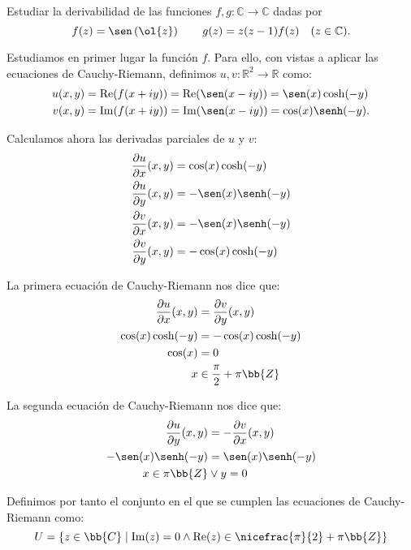 \documentclass[12pt]{article}
\renewcommand{\Re}{\operatorname{Re}} %
\renewcommand{\Im}{\operatorname{Im}}
\begin{document}
    \begin{ejercicio}[3 puntos]
        Estudiar la derivabilidad de las funciones $f, g : \mathbb{C} \to \mathbb{C}$ dadas por
        \[
            f(z) = \sen\left(\ol{z}\right)\qquad g(z) = z(z-1)f(z) \quad (z \in \mathbb{C}).
        \]

        Estudiamos en primer lugar la función $f$. Para ello, con vistas a aplicar las ecuaciones de Cauchy-Riemann, definimos $u,v:\mathbb{R}^2\to \mathbb{R}$ como:
        \begin{align*}
            u(x,y) &= \Re(f(x+iy)) = \Re(\sen(x-iy))=\sen(x)\cosh(-y)\\
            v(x,y) &= \Im(f(x+iy)) = \Im(\sen(x-iy))=\cos(x)\senh(-y).
        \end{align*}

        Calculamos ahora las derivadas parciales de $u$ y $v$:
        \begin{align*}
            \frac{\partial u}{\partial x}(x,y) &= \cos(x)\cosh(-y)\\
            \frac{\partial u}{\partial y}(x,y) &= -\sen(x)\senh(-y)\\
            \frac{\partial v}{\partial x}(x,y) &= -\sen(x)\senh(-y)\\
            \frac{\partial v}{\partial y}(x,y) &= -\cos(x)\cosh(-y)
        \end{align*}

        La primera ecuación de Cauchy-Riemann nos dice que:
        \begin{align*}
            \frac{\partial u}{\partial x}(x,y) &= \frac{\partial v}{\partial y}(x,y)\\
            \cos(x)\cosh(-y) &= -\cos(x)\cosh(-y)\\
            \cos(x)&=0\\
            x &\in  \frac{\pi}{2} + \pi\bb{Z}
        \end{align*}

        La segunda ecuación de Cauchy-Riemann nos dice que:
        \begin{align*}
            \frac{\partial u}{\partial y}(x,y) &= -\frac{\partial v}{\partial x}(x,y)\\
            -\sen(x)\senh(-y) &= \sen(x)\senh(-y)\\
            x\in \pi\bb{Z} &\lor y= 0
        \end{align*}

        Definimos por tanto el conjunto en el que se cumplen las ecuaciones de Cauchy-Riemann como:
        \begin{equation*}
            U = \left\{ z\in \bb{C} \mid \Im(z) = 0 \land \Re(z) \in \nicefrac{\pi}{2} + \pi\bb{Z} \right\}
        \end{equation*}


\end{ejercicio}
\end{document}
